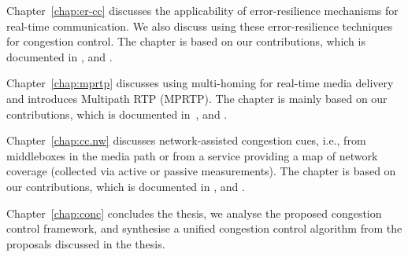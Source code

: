 Chapter~\ref{chap:er-cc} discusses the applicability of error-resilience
mechanisms for real-time communication. We also discuss using these
error-resilience techniques for congestion control. The chapter is based on
our contributions, which is documented in , and
.


Chapter~\ref{chap:mprtp} discusses using multi-homing for real-time media
delivery and introduces Multipath RTP (MPRTP). The chapter is mainly based on
our contributions, which is documented in~\cite{draft.mprtp, draft.mprtp.sdp,
Globisch:AsymGrpComm, draft.rtcp.overlay}, and .



Chapter~\ref{chap:cc.nw} discusses network-assisted congestion cues, i.e.,
from middleboxes in the media path or from a service providing a map of
network coverage (collected via active or passive measurements). The chapter
is based on our contributions, which is documented in ,
 and \cite{glass:patent}.


Chapter~\ref{chap:conc} concludes the thesis, we analyse the proposed
congestion control framework, and synthesise a unified congestion control
algorithm from the proposals discussed in the thesis.
